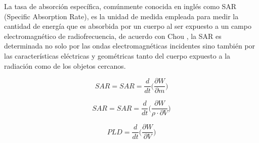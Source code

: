 La tasa de absorción específica, comúnmente conocida en inglés como SAR (Specific Absorption Rate), es la unidad de medida empleada para medir la cantidad de energía que es absorbida por un cuerpo al ser expuesto a un campo electromagnético de radiofrecuencia, de acuerdo con Chou \cite{A028:chou1996radio}, la SAR es determinada no solo por las ondas electromagnéticas incidentes sino también por las características eléctricas y geométricas tanto del cuerpo expuesto a la radiación como de los objetos cercanos.

\begin{equation}
    SAR = SAR = \frac{d}{dt} \bigg( \frac{\partial W}{\partial m} \bigg)
\end{equation}

\begin{equation}
    SAR = SAR = \frac{d}{dt} \bigg( \frac{\partial W}{\rho \cdot \partial V} \bigg)
\end{equation}

\begin{equation}
    PLD = \frac{d}{dt} \bigg( \frac{\partial W}{\partial V} \bigg)
\end{equation}

